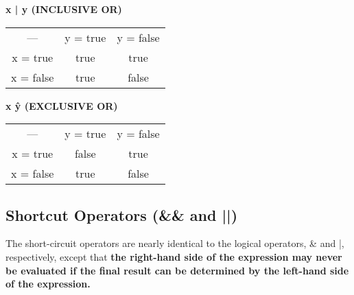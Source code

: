 \documentclass{article}
\begin{document}
\textbf{x | y (INCLUSIVE OR)}
\begin{tabular}{|c|c|c|}
	\cline{1-3}
	--- & y = true & y = false \\
	\cline{1-3}
	x = true & true & true \\
	\cline{1-3}
	x = false & true & false \\
	\cline{1-3}
\end{tabular}

\textbf{x \^ y (EXCLUSIVE OR)}
\begin{tabular}{|c|c|c|}
	\cline{1-3}
	--- & y = true & y = false \\
	\cline{1-3}
	x = true & false & true \\
	\cline{1-3}
	x = false & true & false \\
	\cline{1-3}
\end{tabular}
\subsection{Shortcut Operators (\&\& and ||)}
The short-circuit operators are nearly identical to the logical operators, \& and |, respectively, except that \textbf{the right-hand side of the expression may never be evaluated if the final result can be determined by the left-hand side of the expression.}
\end{document}
